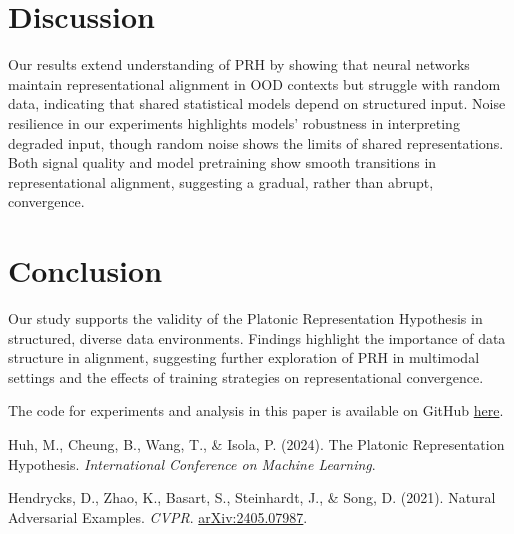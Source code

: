 \documentclass[10pt,a4paper]{article}
\begin{document}
\section{Discussion}
Our results extend understanding of PRH by showing that neural networks maintain representational alignment in OOD contexts but struggle with random data, indicating that shared statistical models depend on structured input. Noise resilience in our experiments highlights models' robustness in interpreting degraded input, though random noise shows the limits of shared representations. Both signal quality and model pretraining show smooth transitions in representational alignment, suggesting a gradual, rather than abrupt, convergence.

\section{Conclusion}
Our study supports the validity of the Platonic Representation Hypothesis in structured, diverse data environments. Findings highlight the importance of data structure in alignment, suggesting further exploration of PRH in multimodal settings and the effects of training strategies on representational convergence.

\vfill
The code for experiments and analysis in this paper is available on GitHub \href{https://github.com/rokosbasilisk/prh-experiments}{here}.

\clearpage
\begin{thebibliography}{9}

Huh, M., Cheung, B., Wang, T., \& Isola, P. (2024). The Platonic Representation Hypothesis. \emph{International Conference on Machine Learning}.

Hendrycks, D., Zhao, K., Basart, S., Steinhardt, J., \& Song, D. (2021). Natural Adversarial Examples. \emph{CVPR}. \href{https://arxiv.org/abs/2405.07987}{arXiv:2405.07987}.

\end{thebibliography}
\end{document}
